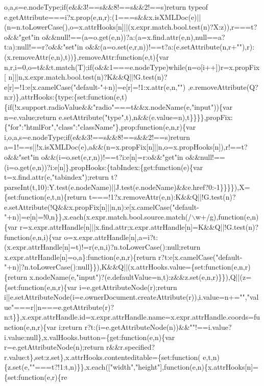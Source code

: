 \begin{DoxyCode}
{       o,a,s=e.nodeType;if(e&&3!==s&&8!==s&&2!==s)return typeof
       e.getAttribute===i?x.prop(e,n,r):(1===s&&x.isXMLDoc(e)||(n=n.toLowerCase(),o=x.attrHooks[n]||(x.expr.match.bool.test(n)?X:z)),r===t?o&&"get"in
       o&&null!==(a=o.get(e,n))?a:(a=x.find.attr(e,n),null==a?t:a):null!==r?o&&"set"in
       o&&(a=o.set(e,r,n))!==t?a:(e.setAttribute(n,r+""),r):(x.removeAttr(e,n),t))\},removeAttr:function(e,t)\{var
       n,r,i=0,o=t&&t.match(T);if(o&&1===e.nodeType)while(n=o[i++])r=x.propFix[
      n]||n,x.expr.match.bool.test(n)?K&&Q||!G.test(n)?e[r]=!1:e[x.camelCase("default-"+n)]=e[r]=!1:x.attr(e,n,"")
      ,e.removeAttribute(Q?n:r)\},attrHooks:\{type:\{set:function(e,t)\{if(!x.support.radioValue&&"radio"===t&&x.nodeName(e,"input"))\{var n=e.value;return
       e.setAttribute("type",t),n&&(e.value=n),t\}\}\}\},propFix:\{"for":"htmlFor","class":"className"\},prop:function(e,n,r)\{var i,o,a,s=e.nodeType;if(e&&3!==s&&8!==s&&2!==s)return
       a=1!==s||!x.isXMLDoc(e),a&&(n=x.propFix[n]||n,o=x.propHooks[n]),r!==t?o&&"set"in
       o&&(i=o.set(e,r,n))!==t?i:e[n]=r:o&&"get"in o&&null!==(i=o.get(e,n))?i:e[n]\},propHooks:\{tabIndex:\{get:function(e)\{var
       t=x.find.attr(e,"tabindex");return
       t?parseInt(t,10):Y.test(e.nodeName)||J.test(e.nodeName)&&e.href?0:-1\}\}\}\}),X=\{set:function(e,t,n)\{return
       t===!1?x.removeAttr(e,n):K&&Q||!G.test(n)?e.setAttribute(!Q&&x.propFix[n]||n,n):e[x.camelCase("default-"+n)]=e[n]=!0,n\}\},x.each(x.expr.match.bool.source.match(/\(\backslash\)w+/g),function(e,n)\{var
       r=x.expr.attrHandle[n]||x.find.attr;x.expr.attrHandle[n]=K&&Q||!G.test(n)?function(e,n,i)\{var
       o=x.expr.attrHandle[n],a=i?t:(x.expr.attrHandle[n]=t)!=r(e,n,i)?n.toLowerCase():null;return x.expr.attrHandle[n]=o,a\}:function(e,n,r)\{return
       r?t:e[x.camelCase("default-"+n)]?n.toLowerCase():null\}\}),K&&Q||(x.attrHooks.value=\{set:function(e,n,r)\{return
       x.nodeName(e,"input")?(e.defaultValue=n,t):z&&z.set(e,n,r)\}\}),Q||(z=\{set:function(e,n,r)\{var
       i=e.getAttributeNode(r);return
       i||e.setAttributeNode(i=e.ownerDocument.createAttribute(r)),i.value=n+="","value"===r||n===e.getAttribute(r)?n:t\}\},x.expr.attrHandle.id=x.expr.attrHandle.name=x.expr.attrHandle.coords=function(e,n,r)\{var
       i;return r?t:(i=e.getAttributeNode(n))&&""!==i.value?i.value:null\},x.valHooks.button=\{get:function(e,n)\{var
       r=e.getAttributeNode(n);return
       r&&r.specified?r.value:t\},set:z.set\},x.attrHooks.contenteditable=\{set:function(
      e,t,n)\{z.set(e,""===t?!1:t,n)\}\},x.each(["width","height"],function(e,n)\{x.attrHooks[n]=\{set:function(e,r)\{re
}
\end{DoxyCode}
